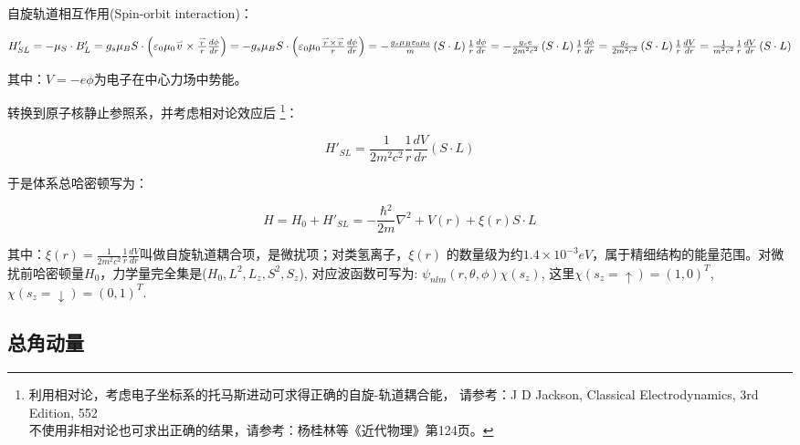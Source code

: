 自旋轨道相互作用(Spin-orbit interaction)：

$H'_{SL}  =  - \mu _S  \cdot B'_L  = g_s \mu _B S \cdot \left( {\varepsilon _0 \mu _0 \mathord{\buildrel{\lower3pt\hbox{$\scriptscriptstyle\rightharpoonup$}}
\over v}  \times \frac{{\mathord{\buildrel{\lower3pt\hbox{$\scriptscriptstyle\rightharpoonup$}}
\over r} }}{r}\frac{{d\phi }}{{dr}}} \right) =  - g_s \mu _B S \cdot \left( {\varepsilon _0 \mu _0 \frac{{\mathord{\buildrel{\lower3pt\hbox{$\scriptscriptstyle\rightharpoonup$}}
\over r}  \times \mathord{\buildrel{\lower3pt\hbox{$\scriptscriptstyle\rightharpoonup$}}
\over v} }}{r}\frac{{d\phi }}{{dr}}} \right) =  - \frac{{g_s \mu _B \varepsilon _0 \mu _0 }}{m}\left( {S \cdot L} \right)\frac{1}{r}\frac{{d\phi }}{{dr}}
  =  - \frac{{g_s e}}{{2m^2 c^2 }}\left( {S \cdot L} \right)\frac{1}{r}\frac{{d\phi }}{{dr}} = \frac{{g_s }}{{2m^2 c^2 }}\left( {S \cdot L} \right)\frac{1}{r}\frac{{dV}}{{dr}} = \frac{1}{{m^2 c^2 }}\frac{1}{r}\frac{{dV}}{{dr}}\left( {S \cdot L} \right)$

其中：$V =  - e\phi $为电子在中心力场中势能。


转换到原子核静止参照系，并考虑相对论效应后
\footnote{利用相对论，考虑电子坐标系的托马斯进动可求得正确的自旋-轨道耦合能，
请参考：J D Jackson, Classical Electrodynamics, 3rd Edition, 552
\\不使用非相对论也可求出正确的结果，请参考：杨桂林等《近代物理》第124页。}：

\begin{equation}\label{30-3}
H'_{SL}  = \frac{1}{{2m^2 c^2 }}\frac{1}{r}\frac{{dV}}{{dr}}\left( {S \cdot L} \right)
\end{equation}

于是体系总哈密顿写为：

\begin{equation}\label{30-4}
H = H_0  + H'_{SL}  =  - \frac{{\hbar {}^2}}{{2m}}\nabla ^2  + V\left( r \right) + \xi \left( r \right)S \cdot L
\end{equation}

其中：$\xi \left( r \right) = \frac{1}{{2m^2 c^2 }}\frac{1}{r}\frac{{dV}}{{dr}}$叫做自旋轨道耦合项，是微扰项；对类氢离子，$\xi \left( r \right)$
的数量级为约$1.4 \times 10^{ - 3} eV$，属于精细结构的能量范围。对微扰前哈密顿量$H_0$，力学量完全集是($H_0, L^2, L_z, S^2,
S_z$), 对应波函数可写为: $\psi_{nlm}(r, \theta, \phi) \chi(s_z)$,
这里$\chi(s_z = \uparrow) = (1,0)^T$, $\chi(s_z = \downarrow) =
(0,1)^T$.


\subsection{总角动量}


